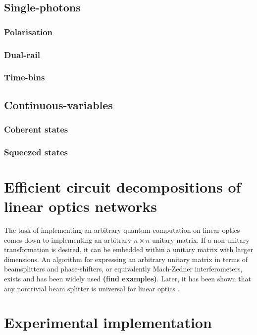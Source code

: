 \documentclass[aps,rmp,twocolumn,amsmath,amssymb,nofootinbib,superscriptaddress]{revtex4}
\newcommand{\comment}[1]{{\color{blue}{#1}}}
\begin{document}
\subsection{Single-photons}

\subsubsection{Polarisation}

\subsubsection{Dual-rail}

\subsubsection{Time-bins}

\subsection{Continuous-variables}

\subsubsection{Coherent states}

\subsubsection{Squeezed states}

\section{Efficient circuit decompositions of linear optics networks}

\comment{Discuss the Reck et al. decomposition}
The task of implementing an arbitrary quantum computation on linear optics comes down to implementing an arbitrary $n\times n$ unitary matrix. If a non-unitary transformation is desired, it can be embedded within a unitary matrix with larger dimensions. An algorithm for expressing an arbitrary unitary matrix in terms of beamsplitters and phase-shifters, or equivalently Mach-Zedner interferometers, exists \cite{bib:Reck1994,bib:Englert2001} and has been widely used {\bf (find examples)}. Later, it has been shown that any nontrivial beam splitter is universal for linear optics \cite{bib:Bouland2014}.

\section{Experimental implementation}
\end{document}
